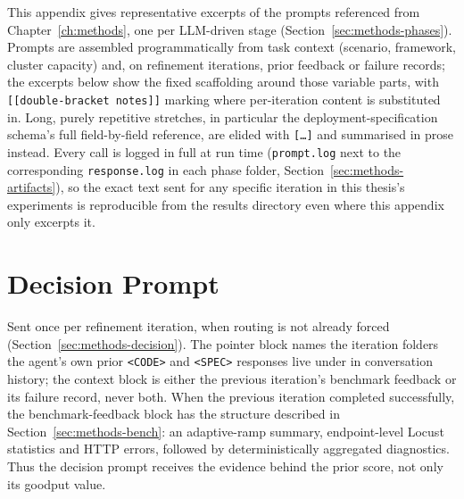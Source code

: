 \label{ch:appendix-prompts}

This appendix gives representative excerpts of the prompts referenced from
Chapter~\ref{ch:methods}, one per LLM-driven stage
(Section~\ref{sec:methods-phases}). Prompts are assembled programmatically
from task context (scenario, framework, cluster capacity) and, on
refinement iterations, prior feedback or failure records; the excerpts
below show the fixed scaffolding around those variable parts, with
\texttt{[[double-bracket notes]]} marking where per-iteration content is
substituted in. Long, purely repetitive stretches, in particular the
deployment-specification schema's full field-by-field reference, are
elided with \texttt{[\ldots]} and summarised in prose instead. Every call
is logged in full at run time (\texttt{prompt.log} next to the
corresponding \texttt{response.log} in each phase folder,
Section~\ref{sec:methods-artifacts}), so the exact text sent for any
specific iteration in this thesis's experiments is reproducible from the
results directory even where this appendix only excerpts it.


\section{Decision Prompt}

Sent once per refinement iteration, when routing is not already forced
(Section~\ref{sec:methods-decision}). The pointer block names the
iteration folders the agent's own prior \texttt{<CODE>} and
\texttt{<SPEC>} responses live under in conversation history; the context
block is either the previous iteration's benchmark feedback or its
failure record, never both.
When the previous iteration completed successfully, the benchmark-feedback
block has the structure described in Section~\ref{sec:methods-bench}: an
adaptive-ramp summary, endpoint-level Locust statistics and HTTP errors,
followed by deterministically aggregated diagnostics. Thus the decision
prompt receives the evidence behind the prior score, not only its goodput
value.

